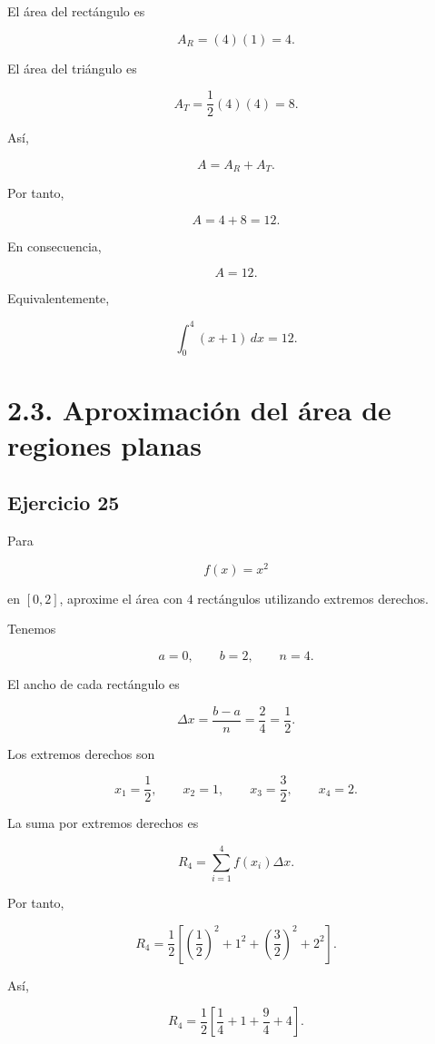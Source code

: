 \documentclass[12pt]{article}
\begin{document}
El área del rectángulo es

\[
A_R=(4)(1)=4.
\]

El área del triángulo es

\[
A_T=
\frac12(4)(4)=8.
\]

Así,

\[
A=A_R+A_T.
\]

Por tanto,

\[
A=4+8=12.
\]

En consecuencia,

\[
\boxed{
A=12
}.
\]

Equivalentemente,

\[
\int_0^4(x+1)\,dx=12.
\]

\section*{2.3. Aproximación del área de regiones planas}

\subsection*{Ejercicio 25}

Para

\[
f(x)=x^2
\]

en \([0,2]\), aproxime el área con \(4\) rectángulos utilizando
extremos derechos.

Tenemos

\[
a=0,\qquad b=2,\qquad n=4.
\]

El ancho de cada rectángulo es

\[
\Delta x=
\frac{b-a}{n}
=
\frac{2}{4}
=
\frac12.
\]

Los extremos derechos son

\[
x_1=\frac12,
\qquad
x_2=1,
\qquad
x_3=\frac32,
\qquad
x_4=2.
\]

La suma por extremos derechos es

\[
R_4
=
\sum_{i=1}^4 f(x_i)\Delta x.
\]

Por tanto,

\[
R_4
=
\frac12
\left[
\left(\frac12\right)^2
+
1^2
+
\left(\frac32\right)^2
+
2^2
\right].
\]

Así,

\[
R_4
=
\frac12
\left[
\frac14+1+\frac94+4
\right].
\]
\end{document}
